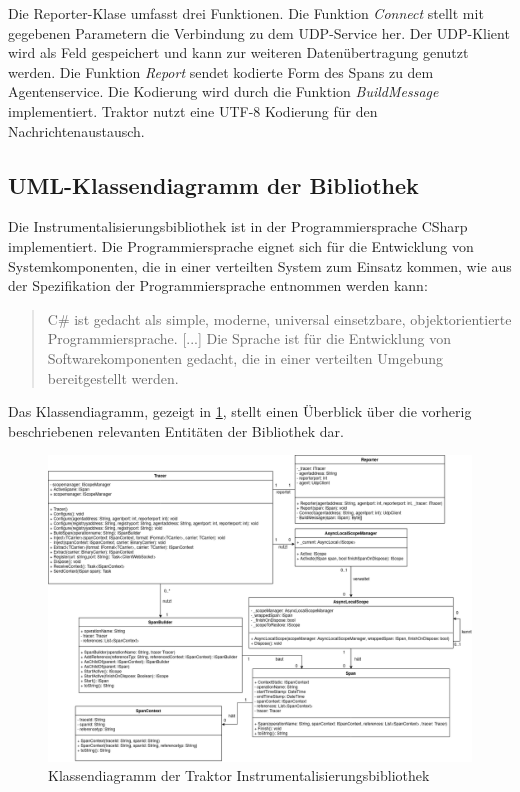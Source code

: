 Die Reporter-Klase umfasst drei Funktionen. Die Funktion \emph{Connect} stellt mit gegebenen Parametern die Verbindung zu dem UDP-Service her. Der UDP-Klient wird als Feld gespeichert und kann zur weiteren Datenübertragung genutzt werden. Die Funktion \emph{Report} sendet kodierte Form des Spans zu dem Agentenservice. Die Kodierung wird durch die Funktion \emph{BuildMessage} implementiert. Traktor nutzt eine UTF-8 Kodierung für den Nachrichtenaustausch.

\subsection{UML-Klassendiagramm der Bibliothek}
\label{subsection:UML-Klassendiagramm der Bibliothek}

Die Instrumentalisierungsbibliothek ist in der Programmiersprache CSharp implementiert. Die Programmiersprache eignet sich für die Entwicklung von Systemkomponenten, die in einer verteilten System zum Einsatz kommen, wie aus der Spezifikation der Programmiersprache entnommen werden kann: 

\begin{quote}
	\cbstart
	C\# ist gedacht als simple, moderne,  universal einsetzbare, objektorientierte Programmiersprache. [...] Die Sprache ist für die Entwicklung von Softwarekomponenten gedacht, die in einer verteilten Umgebung bereitgestellt werden.
	\cbend
\end{quote}

Das Klassendiagramm, gezeigt in \cref{fig:TraktorKlassendiagramm}, stellt einen Überblick über die vorherig beschriebenen relevanten Entitäten der Bibliothek dar.

\newpage
\begin{landscape}
	\begin{figure}
		\centering
		\includegraphics[scale=0.4]{img/Implementierung/TraktorKlassendiagramm.png}
		\caption[Klassendiagramm der Traktor Instrumentalisierungsbibliothek]{Klassendiagramm der Traktor Instrumentalisierungsbibliothek}
		\label{fig:TraktorKlassendiagramm}
	\end{figure}
\end{landscape}

